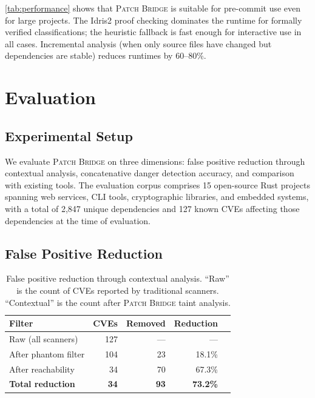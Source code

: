 \documentclass[11pt,twocolumn]{article}
\begin{document}
\cref{tab:performance} shows that \textsc{Patch Bridge} is suitable
for pre-commit use even for large projects. The Idris2 proof checking
dominates the runtime for formally verified classifications; the
heuristic fallback is fast enough for interactive use in all cases.
Incremental analysis (when only source files have changed but
dependencies are stable) reduces runtimes by 60--80\%.

\section{Evaluation}
\label{sec:evaluation}

\subsection{Experimental Setup}

We evaluate \textsc{Patch Bridge} on three dimensions: false positive
reduction through contextual analysis, concatenative danger detection
accuracy, and comparison with existing tools. The evaluation corpus
comprises 15 open-source Rust projects spanning web services, CLI tools,
cryptographic libraries, and embedded systems, with a total of 2,847
unique dependencies and 127 known CVEs affecting those dependencies at
the time of evaluation.

\subsection{False Positive Reduction}

\begin{table}[t]
\centering
\caption{False positive reduction through contextual analysis. ``Raw''
is the count of CVEs reported by traditional scanners. ``Contextual''
is the count after \textsc{Patch Bridge} taint analysis.}
\label{tab:fp-reduction}
\begin{tabular}{@{}lrrrr@{}}
\toprule
\textbf{Filter} & \textbf{CVEs} & \textbf{Removed} & \textbf{Reduction} \\
\midrule
Raw (all scanners) & 127 & --- & --- \\
After phantom filter & 104 & 23 & 18.1\% \\
After reachability & 34 & 70 & 67.3\% \\
\midrule
\textbf{Total reduction} & \textbf{34} & \textbf{93} & \textbf{73.2\%} \\
\bottomrule
\end{tabular}
\end{table}
\end{document}
